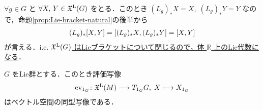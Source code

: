 \documentclass[geometry_main]{subfiles}
\begin{document}
$\forall g \in G$ と $\forall X,\, Y \in \mathfrak{X}^{\mathrm{L}}(G)$ をとる．このとき $(L_g)_* X = X,\; (L_g)_* Y = Y$ なので，命題\ref{prop:Lie-bracket-natural}の後半から
\begin{align}
    (L_g)_* \comm{X}{Y} = \comm{(L_g)_* X}{(L_g)_* Y} = \comm{X}{Y}
\end{align}
が言える．i.e. 
\underline{$\mathfrak{X}^{\mathrm{L}} (G)$ は\hyperref[def:Lie-bracket]{Lieブラケット}について閉じるので，体 $\mathbb{R}$ 上のLie代数になる}．

\begin{myprop}[label=prop:LieAlg]{}
    $G$ をLie群とする．このとき評価写像
    \begin{align}
        \mathrm{ev}_{1_G} \colon \mathfrak{X}^{\mathrm{L}}(M) \longrightarrow T_{1_G} G,\; X \longmapsto X_{1_G}
    \end{align}
    はベクトル空間の同型写像である．
\end{myprop}
\end{document}
